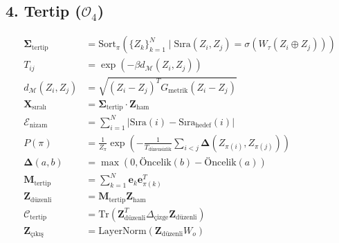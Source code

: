\documentclass[11pt, a4paper]{article}
\begin{document}
\subsection{4. Tertip ($\mathcal{O}_4$)}
\begin{align}
\mathbf{\Sigma}_{\text{tertip}} &= \text{Sort}_{\pi}\left( \{Z_k\}_{k=1}^N \mid \text{Sıra}(Z_i, Z_j) = \sigma(W_\tau (Z_i \oplus Z_j)) \right) \\
T_{ij} &= \exp\left( -\beta d_{\mathcal{M}}(Z_i, Z_j) \right) \\
d_{\mathcal{M}}(Z_i, Z_j) &= \sqrt{(Z_i - Z_j)^T G_{\text{metrik}} (Z_i - Z_j)} \\
\mathbf{X}_{\text{sıralı}} &= \mathbf{\Sigma}_{\text{tertip}} \cdot \mathbf{Z}_{\text{ham}} \\
\mathcal{E}_{\text{nizam}} &= \sum_{i=1}^N |\text{Sıra}(i) - \text{Sıra}_{\text{hedef}}(i)| \\
P(\pi) &= \frac{1}{Z_\pi} \exp\left( -\frac{1}{T_{\text{düzensizlik}}} \sum_{i<j} \mathbf{\Delta}(Z_{\pi(i)}, Z_{\pi(j)}) \right) \\
\mathbf{\Delta}(a, b) &= \max(0, \text{Öncelik}(b) - \text{Öncelik}(a)) \\
\mathbf{M}_{\text{tertip}} &= \sum_{k=1}^N \mathbf{e}_k \mathbf{e}_{\pi(k)}^T \\
\mathbf{Z}_{\text{düzenli}} &= \mathbf{M}_{\text{tertip}} \mathbf{Z}_{\text{ham}} \\
\mathcal{C}_{\text{tertip}} &= \text{Tr}(\mathbf{Z}_{\text{düzenli}}^T \Delta_{\text{çizge}} \mathbf{Z}_{\text{düzenli}}) \\
\mathbf{Z}_{\text{çıkış}} &= \text{LayerNorm}(\mathbf{Z}_{\text{düzenli}} W_o)
\end{align}
\end{document}
